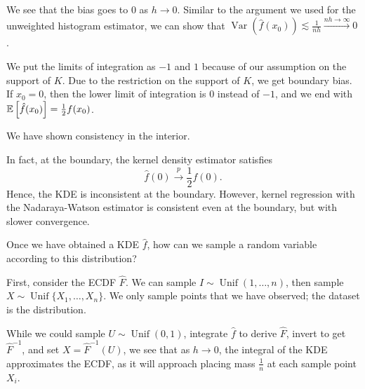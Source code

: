 We see that the bias goes to $0$ as $h \to 0$. Similar to the argument we used for the unweighted histogram estimator, we can show that $\operatorname{Var}\left(\hat{f}(x_0)\right) \lesssim \frac{1}{nh} \xrightarrow{nh \to \infty} 0$.

We put the limits of integration as $-1$ and $1$ because of our assumption on the support of $K$. Due to the restriction on the support of $K$, we get boundary bias. If $x_0 = 0$, then the lower limit of integration is $0$ instead of $-1$, and we end with $\mathbb{E}\left[\hat{f}(x_0)\right]  = \frac{1}{2}f(x_0)$.

We have shown consistency in the interior. 

In fact, at the boundary, the kernel density estimator satisfies \[
	\hat{f}(0) \xrightarrow{p} \frac{1}{2}f(0)
.\] 
Hence, the KDE is inconsistent at the boundary. However, kernel regression with the Nadaraya-Watson estimator is consistent even at the boundary, but with slower convergence.

\medskip

Once we have obtained a KDE $\hat{f}$, how can we sample a random variable according to this distribution?

First, consider the ECDF $\hat{F}$. We can sample $I \sim \operatorname{Unif}(1,\ldots,n)$, then sample $X \sim \operatorname{Unif}\{X_1,\ldots,X_n\}$. We only sample points that we have observed; the dataset is the distribution.

While we could sample $U \sim \operatorname{Unif}(0,1)$, integrate $\hat{f}$ to derive $\hat{F}$, invert to get $\hat{F}^{-1}$, and set $X = \hat{F}^{-1}(U)$, we see that as $h \to 0$, the integral of the KDE approximates the ECDF, as it will approach placing mass $\frac{1}{n}$ at each sample point $X_i$.

